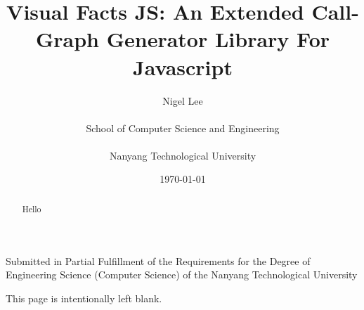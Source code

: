\title{\Large{\textbf{Visual Facts JS: An Extended Call-Graph Generator Library For Javascript}}}
\author{Nigel Lee \\~\\ School of Computer Science and Engineering \\~\\ Nanyang Technological University}
\date{\today}
\maketitle
\thispagestyle{empty}
\newpage
\begin{center}
Submitted in Partial Fulfillment of the Requirements for the Degree of Engineering Science (Computer Science) of the Nanyang Technological University
\end{center}
\newpage
This page is intentionally left blank.
\newpage

\begin{abstract}
    Hello
\end{abstract}

\tableofcontents
\newpage
